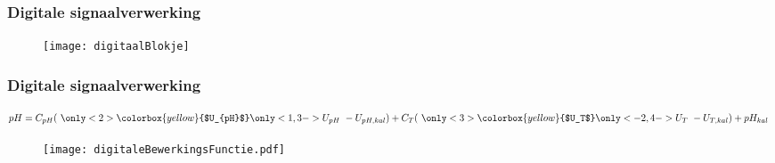 
\begin{frame}
    \frametitle{Digitale signaalverwerking}

    \begin{figure}
        \centering
        \texttt{[image: digitaalBlokje]}
    \end{figure}

\end{frame}

\begin{frame}
    \frametitle{Digitale signaalverwerking}

    \begin{equation*}\label{eq:digitaleBS}
        pH = C_{pH}(\
            \only<2>{\colorbox{yellow}{$U_{pH}$}}\only<1,3->{U_{pH}}\
        - U_{pH,kal}) + C_T(\
            \only<3>{\colorbox{yellow}{$U_T$}}\only<-2,4->{U_T}\
        - U_{T,kal}) + pH_{kal}\
    \end{equation*}
    

    \pause[4]
    
    \begin{figure}
        \centering
        \texttt{[image: digitaleBewerkingsFunctie.pdf]}
    \end{figure}



\end{frame}